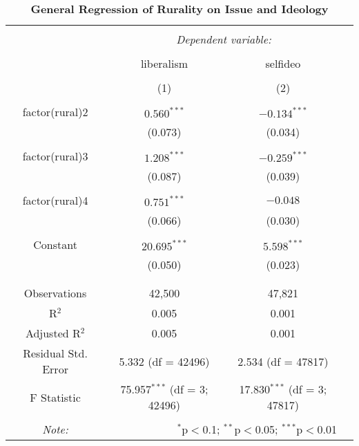 \documentclass[12pt, titlepage]{article}
\newcommand\tb{\textbf}
\begin{document}
\begin{table}[H] \centering 
	\caption{\tb{General Regression of Rurality on Issue and Ideology} }
	\label{GeneralReg} 
	\begin{tabular}{@{\extracolsep{5pt}}cccc } 
		\\[-1.8ex]\hline 
		\hline \\[-1.8ex] 
		& \multicolumn{2}{c}{\textit{Dependent variable:}} \\ 
		\cline{2-3} 
		\\[-1.8ex] & \multicolumn{1}{c}{liberalism} & \multicolumn{1}{c}{selfideo} \\ 
		\\[-1.8ex] & \multicolumn{1}{c}{(1)} & \multicolumn{1}{c}{(2)}\\ 
		\hline \\[-1.8ex] 
		factor(rural)2 & $0.560^{***}$ & $-0.134^{***}$ \\ 
		& (0.073) & (0.034) \\ 
		& & \\ 
		factor(rural)3 & $1.208^{***}$ & $-0.259^{***}$ \\ 
		& (0.087) & (0.039) \\ 
		& & \\ 
		factor(rural)4 & $0.751^{***}$ & $-0.048 $\\ 
		& (0.066) & (0.030) \\ 
		& & \\ 
		Constant & $20.695^{***}$ & $5.598^{***}$ \\ 
		& (0.050) & (0.023) \\ 
		& & \\ 
		\hline \\[-1.8ex] 
		Observations & \multicolumn{1}{c}{42,500} & \multicolumn{1}{c}{47,821} \\ 
		R$^{2}$ & \multicolumn{1}{c}{0.005} & \multicolumn{1}{c}{0.001} \\ 
		Adjusted R$^{2}$ & \multicolumn{1}{c}{0.005} & \multicolumn{1}{c}{0.001} \\ 
		Residual Std. Error & \multicolumn{1}{c}{5.332 (df = 42496)} & \multicolumn{1}{c}{2.534 (df = 47817)} \\ 
		F Statistic & \multicolumn{1}{c}{75.957$^{***}$ (df = 3; 42496)} & \multicolumn{1}{c}{17.830$^{***}$ (df = 3; 47817)} \\ 
		\hline 
		\hline \\[-1.8ex] 
		\textit{Note:}  & \multicolumn{2}{r}{$^{*}$p$<$0.1; $^{**}$p$<$0.05; $^{***}$p$<$0.01} \\ 
	\end{tabular} 
\end{table} 
\end{document}
